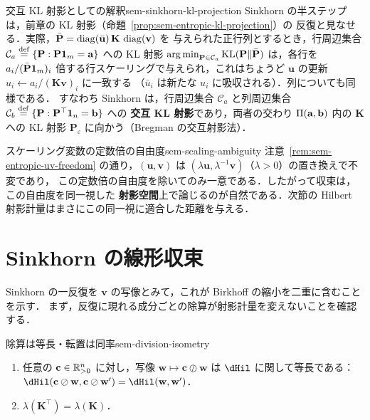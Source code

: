 \begin{remark}{交互 KL 射影としての解釈}{sem-sinkhorn-kl-projection}
  Sinkhorn の半ステップは，前章の KL 射影（命題~\ref{prop:sem-entropic-kl-projection}）の
  反復と見なせる．実際，$\bar{\mathbf{P}} = \operatorname{diag}(\bar{\mathbf{u}})\,\mathbf{K}\,\operatorname{diag}(\mathbf{v})$ を
  与えられた正行列とするとき，行周辺集合
  $\mathcal{C}_a \overset{\mathrm{def}}{=} \{\mathbf{P} : \mathbf{P}\mathbf{1}_m = \mathbf{a}\}$ への KL 射影
  $\operatorname*{arg\,min}_{\mathbf{P}\in\mathcal{C}_a}\mathrm{KL}(\mathbf{P}\|\bar{\mathbf{P}})$ は，各行を
  $a_i / (\bar{\mathbf{P}}\mathbf{1}_m)_i$ 倍する行スケーリングで与えられ，これはちょうど
  $\mathbf{u}$ の更新 $u_i \leftarrow a_i / (\mathbf{K}\mathbf{v})_i$ に一致する
  （$\bar{u}_i$ は新たな $u_i$ に吸収される）．列についても同様である．
  すなわち Sinkhorn は，行周辺集合 $\mathcal{C}_a$ と列周辺集合
  $\mathcal{C}_b \overset{\mathrm{def}}{=} \{\mathbf{P} : \mathbf{P}^\top\mathbf{1}_n = \mathbf{b}\}$ への
  \textbf{交互 KL 射影}であり，両者の交わり $\Pi(\mathbf{a}, \mathbf{b})$ 内の
  $\mathbf{K}$ への KL 射影 $\mathbf{P}_\varepsilon$ に向かう（Bregman の交互射影法）．
\end{remark}

\begin{remark}{スケーリング変数の定数倍の自由度}{sem-scaling-ambiguity}
  注意~\ref{rem:sem-entropic-uv-freedom} の通り，$(\mathbf{u}, \mathbf{v})$ は
  $(\lambda\mathbf{u}, \lambda^{-1}\mathbf{v})$（$\lambda > 0$）の置き換えで不変であり，
  この定数倍の自由度を除いてのみ一意である．したがって収束は，この自由度を同一視した
  \textbf{射影空間}上で論じるのが自然である．次節の Hilbert 射影計量はまさにこの同一視に適合した距離を与える．
\end{remark}


\section{Sinkhorn の線形収束}
\label{sec:sem-sinkhorn-convergence}

Sinkhorn の一反復を $\mathbf{v}$ の写像とみて，これが Birkhoff の縮小を二重に含むことを示す．
まず，反復に現れる成分ごとの除算が射影計量を変えないことを確認する．

\begin{claim}{除算は等長・転置は同率}{sem-division-isometry}
  \begin{enumerate}
    \item 任意の $\mathbf{c} \in \mathbb{R}_{>0}^n$ に対し，写像 $\mathbf{w} \mapsto \mathbf{c}\oslash\mathbf{w}$ は
      $\dHil$ に関して等長である：$\dHil(\mathbf{c}\oslash\mathbf{w}, \mathbf{c}\oslash\mathbf{w}')
      = \dHil(\mathbf{w}, \mathbf{w}')$．
    \item $\lambda(\mathbf{K}^\top) = \lambda(\mathbf{K})$．
  \end{enumerate}
\end{claim}

